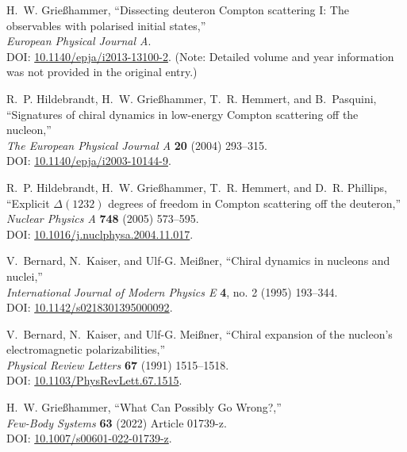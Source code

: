 \documentclass[12pt]{article}
\newcommand{\3}{\ss}
\numberwithin{equation}{section}
\begin{document}
\begin{thebibliography}{44}
H.~W. Grießhammer, 
``Dissecting deuteron Compton scattering I: The observables with polarised initial states,''\\ 
\textit{European Physical Journal A}.\\ 
DOI: \href{https://doi.org/10.1140/epja/i2013-13100-2}{10.1140/epja/i2013-13100-2}. 
(Note: Detailed volume and year information was not provided in the original entry.)

R.~P. Hildebrandt, H.~W. Grießhammer, T.~R. Hemmert, and B.~Pasquini, 
``Signatures of chiral dynamics in low-energy Compton scattering off the nucleon,''\\ 
\textit{The European Physical Journal A} \textbf{20} (2004) 293–315.\\ 
DOI: \href{http://dx.doi.org/10.1140/epja/i2003-10144-9}{10.1140/epja/i2003-10144-9}.

R.~P. Hildebrandt, H.~W. Grießhammer, T.~R. Hemmert, and D.~R. Phillips, 
``Explicit $\Delta(1232)$ degrees of freedom in Compton scattering off the deuteron,''\\ 
\textit{Nuclear Physics A} \textbf{748} (2005) 573–595.\\ 
DOI: \href{https://doi.org/10.1016/j.nuclphysa.2004.11.017}{10.1016/j.nuclphysa.2004.11.017}.

V.~Bernard, N.~Kaiser, and Ulf-G. Meißner, 
``Chiral dynamics in nucleons and nuclei,''\\ 
\textit{International Journal of Modern Physics E} \textbf{4}, no. 2 (1995) 193–344.\\ 
DOI: \href{http://dx.doi.org/10.1142/s0218301395000092}{10.1142/s0218301395000092}.

V.~Bernard, N.~Kaiser, and Ulf-G. Meißner, 
``Chiral expansion of the nucleon's electromagnetic polarizabilities,''\\ 
\textit{Physical Review Letters} \textbf{67} (1991) 1515–1518.\\ 
DOI: \href{http://dx.doi.org/10.1103/PhysRevLett.67.1515}{10.1103/PhysRevLett.67.1515}.

H.~W. Grießhammer, 
``What Can Possibly Go Wrong?,''\\ 
\textit{Few-Body Systems} \textbf{63} (2022) Article 01739-z.\\ 
DOI: \href{http://dx.doi.org/10.1007/s00601-022-01739-z}{10.1007/s00601-022-01739-z}.


\end{thebibliography}
\end{document}
